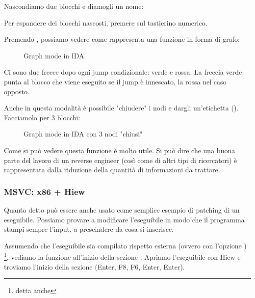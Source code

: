 Nascondiamo due blocchi e diamogli un nome:



Per espandere dei blocchi nascosti, premere \q{+} sul tastierino numerico.

\clearpage
Premendo , possiamo vedere come \IDA rappresenta una funzione in forma di grafo:

\begin{figure}[H]
\centering
{}
\caption{Graph mode in IDA}
\label{fig:ex3_IDA_1}
\end{figure}

Ci sono due frecce dopo ogni jump condizionale: verde e rossa.
La freccia verde punta al blocco che viene eseguito se il jump è innescato, la rossa nel caso opposto.

\clearpage
Anche in questa modalità è possibile "chiudere" i nodi e dargli un'etichetta ().
Facciamolo per 3 blocchi:

\begin{figure}[H]
\centering
{}
\caption{Graph mode in IDA con 3 nodi "chiusi"}
\label{fig:ex3_IDA_2}
\end{figure}

Come si può vedere questa funzione è molto utile.
Si può dire che una buona parte del lavoro di un reverse engineer (così come di altri tipi di ricercatori) è rappresentata dalla riduzione della quantità di informazioni da trattare.



\clearpage
\subsubsection{MSVC: x86 + Hiew}

Quanto detto può essere anche usato come semplice esempio di patching di un eseguibile.
Possiamo provare a modificare l'eseguibile in modo che il programma stampi sempre l'input, a prescindere da cosa si inserisce.

Assumendo che l'eseguibile sia compilato rispetto  esterna (ovvero con l'opzione )
\footnote{detta anche }, 
vediamo la funzione \main all'inizio della sezione .
Apriamo l'eseguibile con Hiew e troviamo l'inizio della sezione  (Enter, F8, F6, Enter, Enter).


